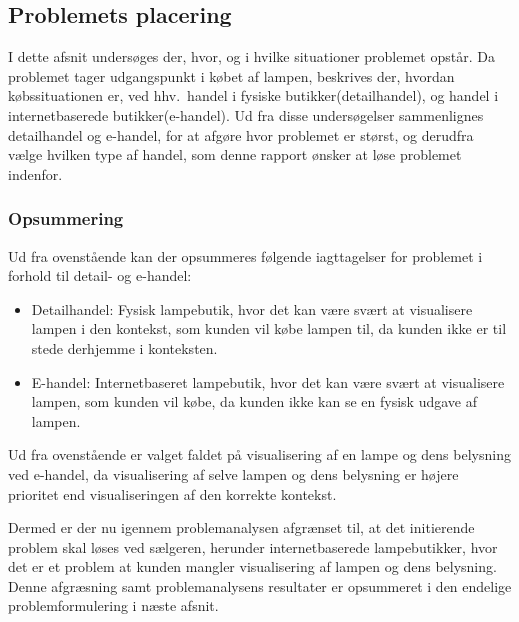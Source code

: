 \subsection{Problemets placering}
I dette afsnit undersøges der, hvor, og i hvilke situationer problemet opstår. Da problemet tager udgangspunkt i købet af lampen, beskrives der, hvordan købssituationen er, ved hhv.\ handel i fysiske butikker(detailhandel), og handel i internetbaserede butikker(e-handel). Ud fra disse undersøgelser sammenlignes detailhandel og e-handel, for at afgøre hvor problemet er størst, og derudfra vælge hvilken type af handel, som denne rapport ønsker at løse problemet indenfor.







\subsubsection*{Opsummering}
Ud fra ovenstående kan der opsummeres følgende iagttagelser for problemet i forhold til detail- og e-handel:
\begin{itemize}
\item Detailhandel: Fysisk lampebutik, hvor det kan være svært at visualisere lampen i den kontekst, som kunden vil købe lampen til, da kunden ikke er til stede derhjemme i konteksten.
\item E-handel: Internetbaseret lampebutik, hvor det kan være svært at visualisere lampen, som kunden vil købe, da kunden ikke kan se en fysisk udgave af lampen.
\end{itemize}
Ud fra ovenstående er valget faldet på visualisering af en lampe og dens belysning ved e-handel, da visualisering af selve lampen og dens belysning er højere prioritet end visualiseringen af den korrekte kontekst.

Dermed er der nu igennem problemanalysen afgrænset til, at det initierende problem skal løses ved sælgeren, herunder internetbaserede lampebutikker, hvor det er et problem at kunden mangler visualisering af lampen og dens belysning. Denne afgræsning samt problemanalysens resultater er opsummeret i den endelige problemformulering i næste afsnit.
